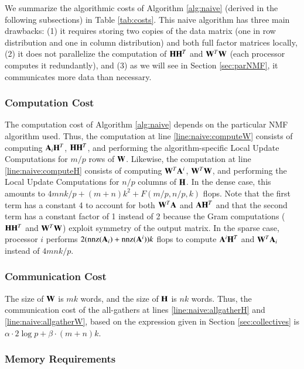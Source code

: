 We summarize the algorithmic costs of Algorithm \ref{alg:naive} (derived in the following subsections) in Table \ref{tab:costs}.
This naive algorithm \cite{Fairbanks2015} has three main drawbacks: (1) it requires storing two copies of the data matrix (one in row distribution and one in column distribution) and both full factor matrices locally, (2) it does not parallelize the computation of $\mathbf{H}\mathbf{H}^T$ and $\mathbf{W}^T\mathbf{W}$ (each processor computes it redundantly), and (3) as we will see in Section \ref{sec:parNMF}, it communicates more data than necessary.

\subsubsection{Computation Cost}

The computation cost of Algorithm \ref{alg:naive} depends on the particular NMF algorithm used.
Thus, the computation at line \ref{line:naive:computeW} consists of computing $\mathbf{A}_i\mathbf{H}^T$, $\mathbf{H}\mathbf{H}^T$, and performing the algorithm-specific Local Update Computations for $m/p$ rows of $\mathbf{W}$.
Likewise, the computation at line \ref{line:naive:computeH} consists of computing $\mathbf{W}^T\mathbf{A}^i$, $\mathbf{W}^T\mathbf{W}$, and performing the Local Update Computations for $n/p$ columns of $\mathbf{H}$.
In the dense case, this amounts to $4mnk/p+(m+n)k^2+F(m/p,n/p,k)$ flops. 
Note that the first term has a constant 4 to account for both $\mathbf{W}^T\mathbf{A}$ and $\mathbf{A}\mathbf{H}^T$ and that the second term has a constant factor of 1 instead of 2 because the Gram computations ($\mathbf{H} \mathbf{H}^T$ and $\mathbf{W}^T \mathbf{W}$) exploit symmetry of the output matrix.
In the sparse case, processor $i$ performs $2(\text{nnz}(\mathbf{A}_i)+\text{nnz}(\mathbf{A}^i))k$ flops to compute $\mathbf{A}^i\mathbf{H}^T$ and $\mathbf{W}^T\mathbf{A}_i$ instead of $4mnk/p$. 

\subsubsection{Communication Cost}

The size of $\mathbf{W}$ is $mk$ words, and the size of $\mathbf{H}$ is $nk$ words.
Thus, the communication cost of the all-gathers at lines \ref{line:naive:allgatherH} and \ref{line:naive:allgatherW}, based on the expression given in Section \ref{sec:collectives} is $\alpha\cdot 2\log p + \beta\cdot (m+n)k$.

\subsubsection{Memory Requirements} \label{sec:memory}

